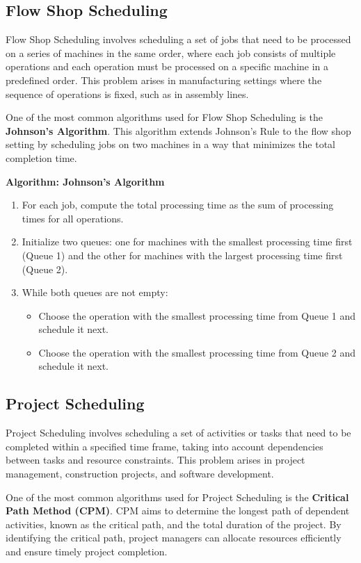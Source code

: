 \documentclass[12pt]{book} %
\begin{document}
\subsection{Flow Shop Scheduling}
Flow Shop Scheduling involves scheduling a set of jobs that need to be processed on a series of machines in the same order, where each job consists of multiple operations and each operation must be processed on a specific machine in a predefined order. This problem arises in manufacturing settings where the sequence of operations is fixed, such as in assembly lines.

One of the most common algorithms used for Flow Shop Scheduling is the \textbf{Johnson's Algorithm}. This algorithm extends Johnson's Rule to the flow shop setting by scheduling jobs on two machines in a way that minimizes the total completion time.

\textbf{Algorithm: Johnson's Algorithm}
\begin{enumerate}
    \item For each job, compute the total processing time as the sum of processing times for all operations.
    \item Initialize two queues: one for machines with the smallest processing time first (Queue 1) and the other for machines with the largest processing time first (Queue 2).
    \item While both queues are not empty:
    \begin{itemize}
        \item Choose the operation with the smallest processing time from Queue 1 and schedule it next.
        \item Choose the operation with the smallest processing time from Queue 2 and schedule it next.
    \end{itemize}
\end{enumerate}

\subsection{Project Scheduling}
Project Scheduling involves scheduling a set of activities or tasks that need to be completed within a specified time frame, taking into account dependencies between tasks and resource constraints. This problem arises in project management, construction projects, and software development.

One of the most common algorithms used for Project Scheduling is the \textbf{Critical Path Method (CPM)}. CPM aims to determine the longest path of dependent activities, known as the critical path, and the total duration of the project. By identifying the critical path, project managers can allocate resources efficiently and ensure timely project completion.
\end{document}
